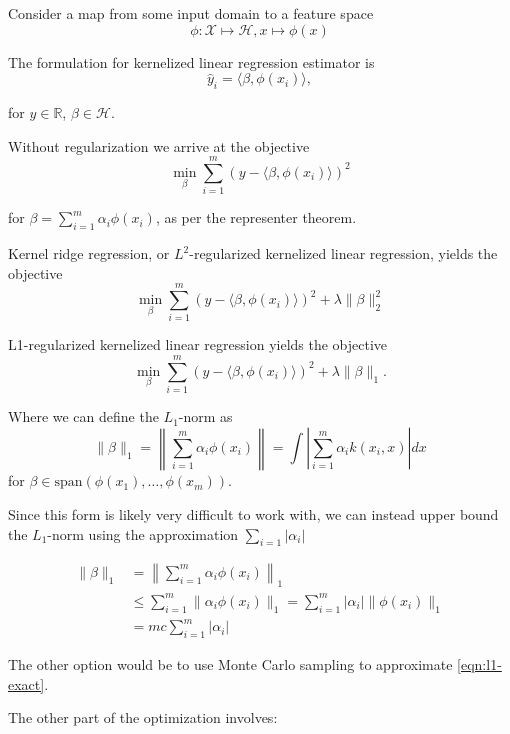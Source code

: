 \documentclass{article}
\newcommand{\hilb}{\mathcal{H}}
\begin{document}
Consider a map from some input domain to a feature space
\begin{equation}
\phi: \mathcal{X} \mapsto \hilb, x \mapsto \phi(x)
\end{equation}


The formulation for kernelized linear regression estimator is
\begin{equation}
\hat{y}_i = \langle \beta, \phi(x_i) \rangle,
\end{equation}

for $y \in \mathbb{R}$, $\beta \in \hilb$.


Without regularization we arrive at the objective
\begin{equation}
\min_\beta \sum_{i=1}^m (y - \langle \beta, \phi(x_i) \rangle)^2 
\end{equation}

for $\beta = \sum_{i=1}^m \alpha_i \phi(x_i)$, as per the representer theorem.

Kernel ridge regression, or $L^2$-regularized kernelized linear regression, yields the objective
\begin{equation}
\min_\beta \sum_{i=1}^m (y - \langle \beta, \phi(x_i) \rangle)^2 + \lambda \| \beta \|_2^2
\end{equation}

L1-regularized kernelized linear regression yields the objective
\begin{equation}
\min_\beta \sum_{i=1}^m (y - \langle \beta, \phi(x_i) \rangle)^2 + \lambda \| \beta \|_1.
\end{equation}

Where we can define the $L_1$-norm as
\begin{equation} \label{eqn:l1-exact}
\| \beta \|_1 = \left\| \sum_{i=1}^m \alpha_i \phi(x_i) \right\| = \int \left| \sum_{i=1}^m \alpha_i k(x_i, x) \right| dx
\end{equation}
for $\beta \in \text{span}(\phi(x_1), \ldots, \phi(x_m))$.

Since this form is likely very difficult to work with, we can instead upper bound the $L_1$-norm using the approximation $\sum_{i=1} | \alpha_i |$

\begin{align*}
  \| \beta \|_1 &= \left\| \sum_{i=1}^m \alpha_i \phi(x_i) \right\|_1 \\
  &\leq \sum_{i=1}^m \| \alpha_i \phi(x_i) \|_1 = \sum_{i=1}^m | \alpha_i | \| \phi(x_i) \|_1 \\
  & = m c \sum_{i=1}^m | \alpha_i |
\end{align*}

The other option would be to use Monte Carlo sampling to approximate \eqref{eqn:l1-exact}.


The other part of the optimization involves:
\end{document}
